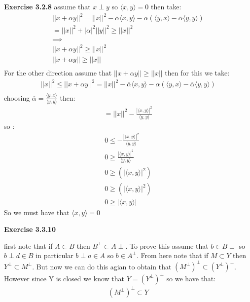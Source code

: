 \documentclass[12pt]{article}
\newcommand{\mpp}{(M^\perp)^\perp}
\newenvironment{exercise}[1]{\vspace{.1in}\noindent\textbf{Exercise #1 \hspace{.05em}}}{}
\theoremstyle{definition}
\theoremstyle{remark}
\begin{document}
\begin{exercise}{3.2.8}
	assume that $x\perp y$ so $\langle x, y\rangle =0$ then take:
	\begin{align}
		||x+\alpha y||^2=||x||^2- \overline{\alpha} \langle x, y\rangle -\alpha (\langle y, x\rangle - \overline{\alpha}\langle y, y\rangle ) \\
		=||x||^2+|\alpha|^2 ||y||^2\geq ||x||^2                                                                                               \\
		\implies                                                                                                                              \\
		||x+\alpha y||^2\geq ||x||^2                                                                                                          \\
		||x+\alpha y||\geq ||x||                                                                                                              \\
	\end{align}
	For the other direction assume that $||x+\alpha y||\geq ||x||$ then for this we take:
	\begin{align}
		||x||^2\leq ||x+\alpha y||^2=||x||^2- \overline{\alpha} \langle x, y\rangle -\alpha (\langle y, x\rangle - \overline{\alpha}\langle y, y\rangle ) \\
	\end{align}
	choosing $\overline{\alpha}=\frac{\langle y, x\rangle }{\langle y, y\rangle }$ then:
	\begin{align}
		= ||x||^2-\frac{|\langle x, y\rangle |^2}{\langle y, y\rangle }
	\end{align}
	so :
	\begin{align}
		0\leq -\frac{|\langle x, y\rangle |^2}{\langle y, y\rangle } \\
		0\geq \frac{|\langle x, y\rangle |^2}{\langle y, y\rangle }  \\
		0\geq (|\langle x, y\rangle |^2)                             \\
		0\geq (|\langle x, y\rangle |^2)                             \\
		0\geq |\langle x, y\rangle |
	\end{align}
	So we must have that $\langle x,y\rangle = 0$
\end{exercise}

\begin{exercise}{3.3.10}

	first note that if $A\subset B$ then $B^\perp\subset A\perp$. To prove this assume that $b\in B\perp$ so $b\perp d\in B$ in particular $b\perp a\in A$ so $b\in A^{\perp}$. From here note that if $M\subset Y$ then $Y^\perp \subset M^\perp$. But now we can do this agian to obtain that $(M^{\perp})^\perp\subset (Y^{\perp})^\perp$. However since Y is closed we know that $Y=(Y^\perp)^\perp$ so we have that:
	\begin{align}
		\mpp\subset Y
	\end{align}

\end{exercise}
\end{document}
